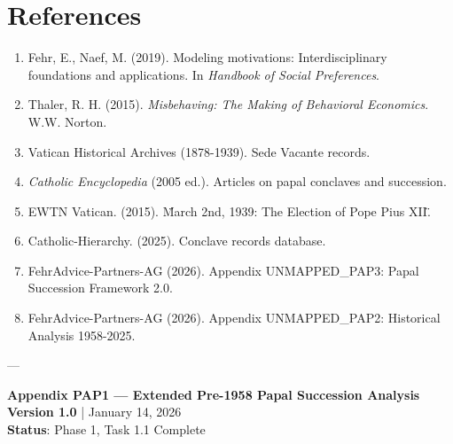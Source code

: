 \section{References}

\nocite{bcm_master}


\small

\begin{enumerate}
    \item Fehr, E., Naef, M. (2019). Modeling motivations: Interdisciplinary foundations and applications. In \textit{Handbook of Social Preferences}.
    \item Thaler, R. H. (2015). \textit{Misbehaving: The Making of Behavioral Economics}. W.W. Norton.
    \item Vatican Historical Archives (1878-1939). Sede Vacante records.
    \item \textit{Catholic Encyclopedia} (2005 ed.). Articles on papal conclaves and succession.
    \item EWTN Vatican. (2015). \"March 2nd, 1939: The Election of Pope Pius XII.\"
    \item Catholic-Hierarchy. (2025). Conclave records database.
    \item FehrAdvice-Partners-AG (2026). Appendix UNMAPPED_PAP3: Papal Succession Framework 2.0.
    \item FehrAdvice-Partners-AG (2026). Appendix UNMAPPED_PAP2: Historical Analysis 1958-2025.
\end{enumerate}

---

\textbf{Appendix PAP1 --- Extended Pre-1958 Papal Succession Analysis}\\
\textbf{Version 1.0} | January 14, 2026\\
\textbf{Status}: Phase 1, Task 1.1 Complete



